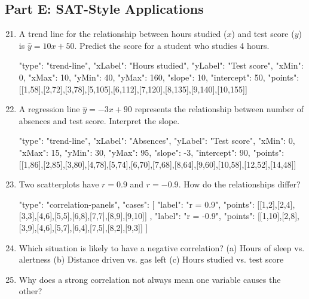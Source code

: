 \documentclass[14pt]{extarticle}
\begin{document}
\subsection*{Part E: SAT-Style Applications}
\begin{enumerate}
  \setcounter{enumi}{20}
  \item A trend line for the relationship between hours studied (\(x\)) and test score (\(y\)) is \(\hat{y} = 10x + 50\). Predict the score for a student who studies 4 hours.
  \begin{diagramdata}
  {
    "type": "trend-line",
    "xLabel": "Hours studied",
    "yLabel": "Test score",
    "xMin": 0,
    "xMax": 10,
    "yMin": 40,
    "yMax": 160,
    "slope": 10,
    "intercept": 50,
    "points": [[1,58],[2,72],[3,78],[5,105],[6,112],[7,120],[8,135],[9,140],[10,155]]
  }
  \end{diagramdata}
  \item A regression line \(\hat{y} = -3x + 90\) represents the relationship between number of absences and test score. Interpret the slope.
  \begin{diagramdata}
  {
    "type": "trend-line",
    "xLabel": "Absences",
    "yLabel": "Test score",
    "xMin": 0,
    "xMax": 15,
    "yMin": 30,
    "yMax": 95,
    "slope": -3,
    "intercept": 90,
    "points": [[1,86],[2,85],[3,80],[4,78],[5,74],[6,70],[7,68],[8,64],[9,60],[10,58],[12,52],[14,48]]
  }
  \end{diagramdata}
  \item Two scatterplots have \(r = 0.9\) and \(r = -0.9\). How do the relationships differ?
  \begin{diagramdata}
  {
    "type": "correlation-panels",
    "cases": [
      {
        "label": "r = 0.9",
        "points": [[1,2],[2,4],[3,3],[4,6],[5,5],[6,8],[7,7],[8,9],[9,10]]
      },
      {
        "label": "r = -0.9",
        "points": [[1,10],[2,8],[3,9],[4,6],[5,7],[6,4],[7,5],[8,2],[9,3]]
      }
    ]
  }
  \end{diagramdata}
  \item Which situation is likely to have a negative correlation?  
  (a) Hours of sleep vs. alertness  
  (b) Distance driven vs. gas left  
  (c) Hours studied vs. test score
  \item Why does a strong correlation not always mean one variable causes the other?
\end{enumerate}

\newpage

\end{document}
